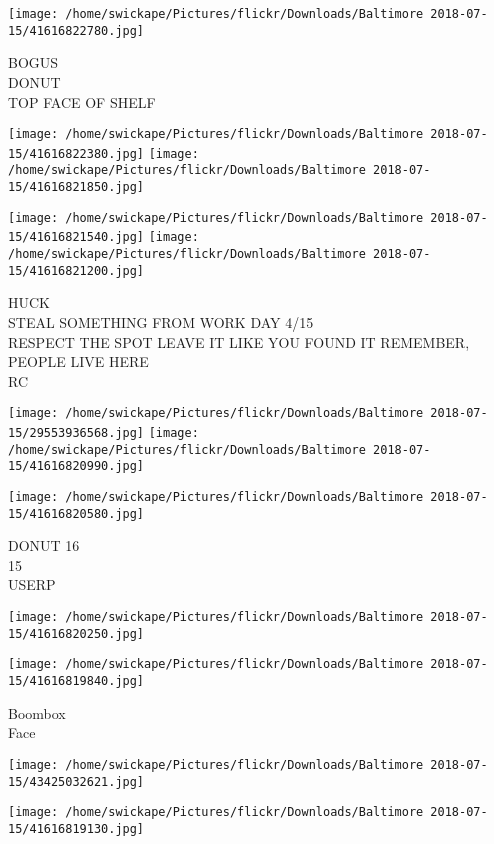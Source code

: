 \documentclass[10pt,letterpaper]{article}
\begin{document}
\vspace{0.25in}
\texttt{[image: /home/swickape/Pictures/flickr/Downloads/Baltimore 2018-07-15/41616822780.jpg]}

BOGUS\\
DONUT\\
TOP FACE OF SHELF
\pagebreak

\texttt{[image: /home/swickape/Pictures/flickr/Downloads/Baltimore 2018-07-15/41616822380.jpg]}
\texttt{[image: /home/swickape/Pictures/flickr/Downloads/Baltimore 2018-07-15/41616821850.jpg]}

\texttt{[image: /home/swickape/Pictures/flickr/Downloads/Baltimore 2018-07-15/41616821540.jpg]}
\texttt{[image: /home/swickape/Pictures/flickr/Downloads/Baltimore 2018-07-15/41616821200.jpg]}

HUCK\\
STEAL SOMETHING FROM WORK DAY 4/15\\
RESPECT THE SPOT LEAVE IT LIKE YOU FOUND IT REMEMBER, PEOPLE LIVE HERE\\
RC
\pagebreak

\texttt{[image: /home/swickape/Pictures/flickr/Downloads/Baltimore 2018-07-15/29553936568.jpg]}
\texttt{[image: /home/swickape/Pictures/flickr/Downloads/Baltimore 2018-07-15/41616820990.jpg]}

\vspace{0.25in}
\texttt{[image: /home/swickape/Pictures/flickr/Downloads/Baltimore 2018-07-15/41616820580.jpg]}

DONUT 16\\
15\\
USERP
\pagebreak

\texttt{[image: /home/swickape/Pictures/flickr/Downloads/Baltimore 2018-07-15/41616820250.jpg]}

\vspace{0.25in}
\texttt{[image: /home/swickape/Pictures/flickr/Downloads/Baltimore 2018-07-15/41616819840.jpg]}

Boombox\\
Face
\pagebreak

\texttt{[image: /home/swickape/Pictures/flickr/Downloads/Baltimore 2018-07-15/43425032621.jpg]}

\vspace{0.25in}
\texttt{[image: /home/swickape/Pictures/flickr/Downloads/Baltimore 2018-07-15/41616819130.jpg]}
\end{document}
